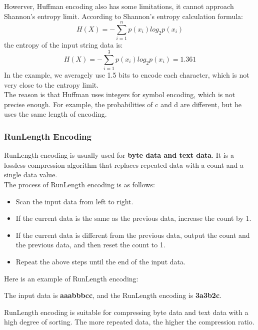 \documentclass[sigconf]{acmart}
\begin{document}
    Howerver, Huffman encoding also has some limitations, it cannot approach Shannon's entropy limit.
    According to Shannon's entropy calculation formula:
    \begin{equation}
        H(X) = -\sum_{i=1}^{n}p(x_i)log_2p(x_i)
    \end{equation}
    the entropy of the input string data is:
    \begin{equation}
        H(X) = -\sum_{i=1}^{3}p(x_i)log_2p(x_i) = 1.361
    \end{equation}
    In the example, we averagely use 1.5 bits to encode each character, which is not very close to the entropy limit.\\

    The reason is that Huffman uses integers for symbol encoding, which is not precise enough. For example, the probabilities of c and d are different, but he uses the same length of encoding.

\subsubsection*{RunLength Encoding}

    RunLength encoding is usually used for \textbf{byte data and text data}. It is a lossless compression algorithm that replaces repeated data with a count and a single data value. \\
    The process of RunLength encoding is as follows:
    \begin{itemize}
        \item Scan the input data from left to right.
        \item If the current data is the same as the previous data, increase the count by 1.
        \item If the current data is different from the previous data, output the count and the previous data, and then reset the count to 1.
        \item Repeat the above steps until the end of the input data.
    \end{itemize}

    Here is an example of RunLength encoding:

    The input data is \textbf{aaabbbcc}, and the RunLength encoding is \textbf{3a3b2c}.

    RunLength encoding is suitable for compressing byte data and text data with a high degree of sorting. The more repeated data, the higher the compression ratio.\\
\end{document}

